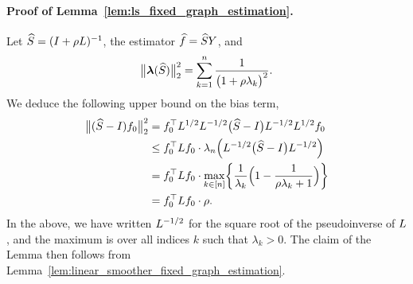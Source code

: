 \paragraph{Proof of Lemma~\ref{lem:ls_fixed_graph_estimation}.}
Let $\widehat{S} = (I + \rho L)^{-1}$, the estimator $\widehat{f} = \widehat{S}Y$, and
\begin{equation*}
\bigl\|\boldsymbol{\lambda}(\widehat{S})\bigr\|_2^2 = \sum_{k = 1}^{n} \frac{1}{\bigl(1 + \rho \lambda_k\bigr)^2}.
\end{equation*} 
We deduce the following upper bound on the bias term,
\begin{equation*}
\begin{aligned}
\bigl\|(\widehat{S} - I)f_0\bigr\|_2^2 & = f_0^{\top} L^{1/2} L^{-1/2}\bigl(\widehat{S} - I\bigr) L^{-1/2} L^{1/2} f_0 \\
& \leq f_0^{\top} L f_0 \cdot \lambda_n\Bigl(L^{-1/2}\bigl(\widehat{S} - I\bigr)L^{-1/2}\Bigr) \\
& = f_0^{\top} L f_0 \cdot \max_{k \in [n]} \biggl\{\frac{1}{\lambda_k} \Bigl(1 - \frac{1}{\rho\lambda_k + 1}\Bigr) \biggr\} \\
& = f_0^{\top} L f_0 \cdot \rho.
\end{aligned}
\end{equation*} 
In the above, we have written $L^{-1/2}$ for the square root of the pseudoinverse of $L$, and the maximum is over all indices $k$ such that $\lambda_k > 0$. The claim of the Lemma then follows from Lemma~\ref{lem:linear_smoother_fixed_graph_estimation}.

